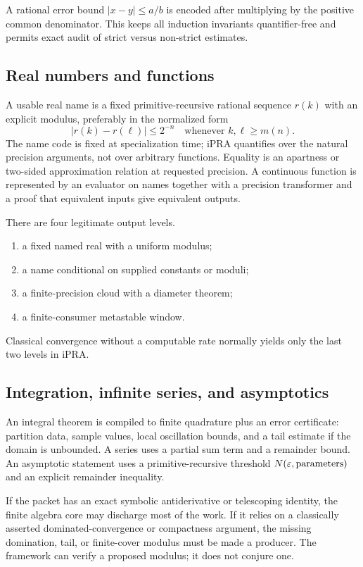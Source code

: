 A rational error bound \(|x-y|\le a/b\) is encoded after multiplying by the
positive common denominator.  This keeps all induction invariants
quantifier-free and permits exact audit of strict versus non-strict estimates.

\subsection{Real numbers and functions}

A usable real name is a fixed primitive-recursive rational sequence \(r(k)\)
with an explicit modulus, preferably in the normalized form
\[
      |r(k)-r(\ell)|\le 2^{-n}
      \quad\text{whenever }k,\ell\ge m(n).
\]
The name code is fixed at specialization time; iPRA quantifies over the natural
precision arguments, not over arbitrary functions.  Equality is an apartness
or two-sided approximation relation at requested precision.  A continuous
function is represented by an evaluator on names together with a precision
transformer and a proof that equivalent inputs give equivalent outputs.

There are four legitimate output levels.
\begin{enumerate}[label=(R\arabic*)]
\item a fixed named real with a uniform modulus;
\item a name conditional on supplied constants or moduli;
\item a finite-precision cloud with a diameter theorem;
\item a finite-consumer metastable window.
\end{enumerate}
Classical convergence without a computable rate normally yields only the last
two levels in iPRA.

\subsection{Integration, infinite series, and asymptotics}

An integral theorem is compiled to finite quadrature plus an error certificate:
partition data, sample values, local oscillation bounds, and a tail estimate if
the domain is unbounded.  A series uses a partial sum term and a remainder
bound.  An asymptotic statement uses a primitive-recursive threshold
\(N(\varepsilon,\text{parameters})\) and an explicit remainder inequality.

If the packet has an exact symbolic antiderivative or telescoping identity,
the finite algebra core may discharge most of the work.  If it relies on a
classically asserted dominated-convergence or compactness argument, the
missing domination, tail, or finite-cover modulus must be made a producer.
The framework can verify a proposed modulus; it does not conjure one.

